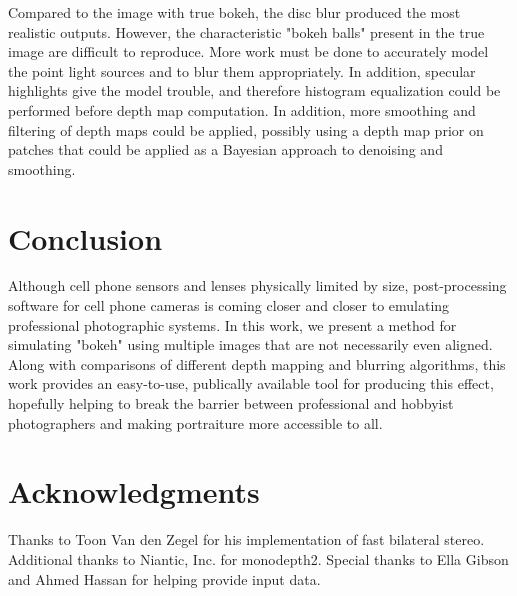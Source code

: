 \documentclass[10pt,twocolumn,letterpaper]{article}
\begin{document}
\par Compared to the image with true bokeh, the disc blur produced the most realistic outputs. However, the characteristic "bokeh balls" present in the true image are
difficult to reproduce. More work must be done to accurately model the point light sources and to blur them appropriately. In addition, specular highlights give the model
trouble, and therefore histogram equalization could be performed before depth map computation. In addition, more smoothing and filtering of depth maps could be applied,
possibly using a depth map prior on patches that could be applied as a Bayesian approach to denoising and smoothing.

\section{Conclusion}

Although cell phone sensors and lenses physically limited by size, post-processing software for cell phone cameras is coming closer and closer to emulating professional photographic systems. In this work, we present a method for simulating "bokeh"
using multiple images that are not necessarily even aligned. Along with comparisons of different depth mapping and blurring algorithms, this work provides an easy-to-use, publically available tool for
producing this effect, hopefully helping to break the barrier between professional and hobbyist photographers and making portraiture more accessible to all.

\section*{Acknowledgments}

Thanks to Toon Van den Zegel for his implementation of fast bilateral stereo. Additional thanks to Niantic, Inc. for monodepth2. Special thanks to Ella Gibson and Ahmed Hassan for helping provide input data.

{\small

}
\end{document}
